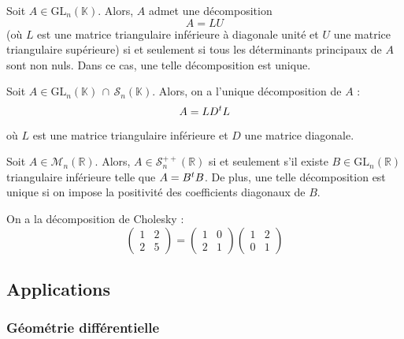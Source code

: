   \begin{theorem}
    \label{157-2}
    Soit $A \in \mathrm{GL}_n(\mathbb{K})$. Alors, $A$ admet une décomposition
    \[ A = LU \]
    (où $L$ est une matrice triangulaire inférieure à diagonale unité et $U$ une matrice triangulaire supérieure) si et seulement si tous les déterminants principaux de $A$ sont non nuls. Dans ce cas, une telle décomposition est unique.
  \end{theorem}

  \begin{corollary}
    Soit $A \in \mathrm{GL}_n(\mathbb{K}) \, \cap \, \mathcal{S}_n(\mathbb{K})$. Alors, on a l'unique décomposition de $A$ :
    \[ A = LD\mathstrut ^t L \]
    où $L$ est une matrice triangulaire inférieure et $D$ une matrice diagonale.
  \end{corollary}

  \begin{application}
    Soit $A \in \mathcal{M}_n(\mathbb{R})$. Alors, $A \in \mathcal{S}_n^{++}(\mathbb{R})$ si et seulement s'il existe $B \in \mathrm{GL}_n(\mathbb{R})$ triangulaire inférieure telle que $A = B\mathstrut ^t B$. De plus, une telle décomposition est unique si on impose la positivité des coefficients diagonaux de $B$.
  \end{application}


  \begin{example}
    On a la décomposition de Cholesky :
    \[ \begin{pmatrix} 1 & 2 \\ 2 & 5 \end{pmatrix} = \begin{pmatrix} 1 & 0 \\ 2 & 1 \end{pmatrix} \begin{pmatrix} 1 & 2 \\ 0 & 1 \end{pmatrix} \]
  \end{example}

  \subsection{Applications}

  \subsubsection{Géométrie différentielle}

